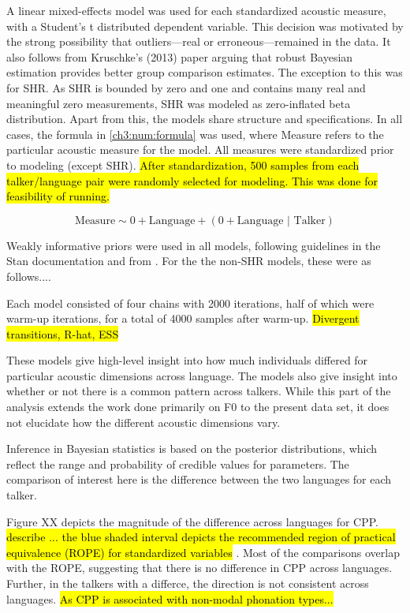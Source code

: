 A linear mixed-effects model was used for each standardized acoustic measure, with a Student's t distributed dependent variable. This decision was motivated by the strong possibility that outliers---real or erroneous---remained in the data. It also follows from Kruschke's (2013) paper arguing that robust Bayesian estimation provides better group comparison estimates. The exception to this was for SHR. As SHR is bounded by zero and one and contains many real and meaningful zero measurements, SHR was modeled as zero-inflated beta distribution. Apart from this, the models share structure and specifications. In all cases, the formula in \ref{ch3:num:formula} was used, where Measure refers to the particular acoustic measure for the model. All measures were standardized prior to modeling (except SHR). \hl{After standardization, 500 samples from each talker/language pair were randomly selected for modeling. This was done for feasibility of running.}
    
    \begin{equation}\label{ch3:num:formula}
        \text{Measure} \sim 0 + \text{Language} + (0 + \text{Language }|\text{ Talker})
    \end{equation}
    
Weakly informative priors were used in all models, following guidelines in the Stan documentation \citep{gelman_2020_prior} and from \citet{mcelreath_2020_sr}. For the the non-SHR models, these were as follows.... 

Each model consisted of four chains with 2000 iterations, half of which were warm-up iterations, for a total of 4000 samples after warm-up. \hl{ Divergent transitions, R-hat, ESS }
    
These models give high-level insight into how much individuals differed for particular acoustic dimensions across language. The models also give insight into whether or not there is a common pattern across talkers. While this part of the analysis extends the work done primarily on F0 \citep[e.g., by][]{} to the present data set, it does not elucidate how the different acoustic dimensions vary. 
    
Inference in Bayesian statistics is based on the posterior distributions, which reflect the range and probability of credible values for parameters. The comparison of interest here is the difference between the two languages for each talker. 

Figure XX depicts the magnitude of the difference across languages for CPP. \hl{describe ... the blue shaded interval depicts the recommended region of practical equivalence (ROPE) for standardized variables} \citep{kruschke_2011_rope}. Most of the comparisons overlap with the ROPE, suggesting that there is no difference in CPP across languages. Further, in the talkers with a differce, the direction is not consistent across languages. \hl{As CPP is associated with non-modal phonation types...}


